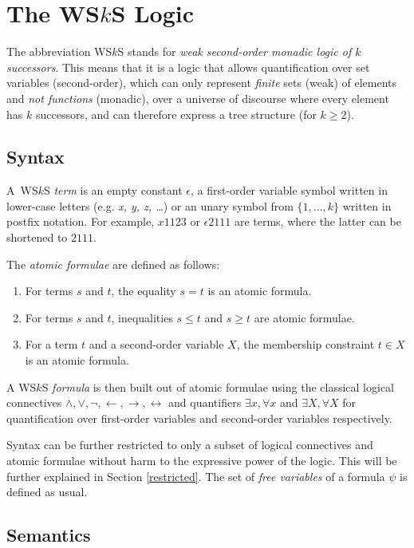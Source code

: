 \chapter{The WS$k$S Logic}\label{wsks}
The abbreviation WS$k$S stands for \emph{weak second-order monadic logic of $k$
successors}. This means that it is a logic that allows quantification over set
variables (second-order), which can only represent \emph{finite} sets (weak) of
elements and \emph{not functions} (monadic), over a universe of discourse where
every element has $k$ successors, and can therefore express a tree structure
(for $k \geq 2$).
 
 \section{Syntax}
 A~WS$k$S \emph{term} is an empty constant $\epsilon$, a first-order variable
 symbol written in lower-case letters (e.g. \emph{x, y, z, \ldots}) or an unary
 symbol from $\{1,\ldots,k\}$ written in postfix notation.
 For example, $x1123$ or $\epsilon2111$ are terms, where the latter can be
 shortened to $2111$.

The \emph{atomic formulae} are defined as follows:
 \begin{enumerate}
  \item For terms $s$ and $t$, the equality $s = t$ is an atomic formula.
\item For terms $s$ and $t$, inequalities $s \leq t$ and $s \geq t$ are atomic
formulae.
\item For a term $t$ and a second-order variable $X$, the membership constraint
$t \in X$ is an atomic formula.
 \end{enumerate}

A WS$k$S \emph{formula} is then built out of atomic formulae using the
classical logical connectives $\wedge, \vee, \neg, \leftarrow, \rightarrow,
\leftrightarrow$ and quantifiers $\exists x, \forall x$ and $\exists X, \forall
X$ for quantification over first-order variables and second-order variables
respectively.

Syntax can be further restricted to only a subset of logical connectives and
atomic formulae without harm to the expressive power of the logic. This will be
further explained in Section \ref{restricted}. The set of \emph{free variables}
of a formula $\psi$ is defined as usual.
  
  \section{Semantics}
	
